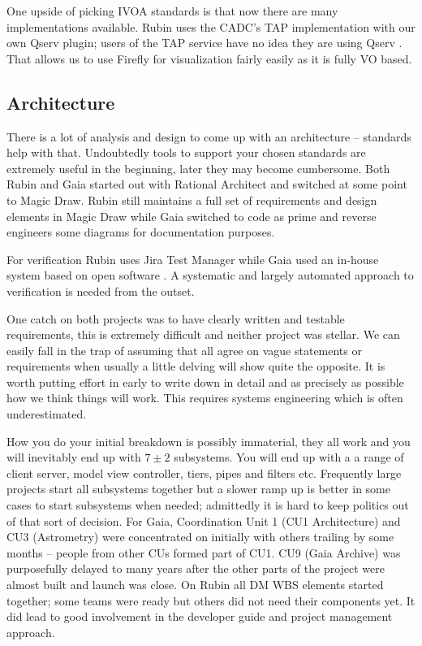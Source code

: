\documentclass[11pt,twoside]{article}
\begin{document}
One upside of picking IVOA standards is that now there are many implementations available.
Rubin uses the CADC's TAP implementation  with our own Qserv  plugin; users of the TAP service have no idea they are using Qserv .
That allows us to use Firefly for visualization fairly easily as it is
fully VO based.

\subsection{Architecture}
There is a lot of analysis and design to come up with an architecture -- standards help with that.
Undoubtedly tools to support your chosen standards are extremely useful in the beginning, later they may become cumbersome. Both Rubin and Gaia started out with Rational Architect and switched at some point to Magic Draw.
Rubin still maintains a full set of requirements and design elements in Magic Draw while Gaia switched to code as prime and reverse engineers some diagrams for documentation purposes.

For verification  Rubin uses  Jira Test Manager \citep{2018SPIE10705E..0US}  while  Gaia  used an in-house system based on open software \citep{2012SPIE.8449E..0GC}.
A systematic and largely automated approach to verification is needed from the outset.

One catch on both projects was to have clearly written and testable requirements, this is extremely difficult and neither project was stellar.
We can easily fall in the trap of assuming that all agree on vague statements or requirements when usually a little delving will show quite the opposite.
It is worth putting effort in early to write down in detail and as precisely as possible how we think things will work.
This requires systems engineering which is often underestimated.


How you do your initial breakdown is possibly immaterial, they all work and you will inevitably end up with $7 \pm 2$ subsystems.
You will end up with a a range of client server, model view controller, tiers, pipes and filters etc.
Frequently large projects start all subsystems together but
a slower ramp up is better in some cases to start subsystems when needed; admittedly it is  hard to keep politics out of that sort of decision.
For Gaia, Coordination Unit 1 (CU1 Architecture) and CU3 (Astrometry) were concentrated on initially with others trailing by some months -- people from other CUs formed part of CU1.
CU9 (Gaia Archive) was purposefully delayed to many years after the other parts of the project were almost built and launch was close.
On Rubin all DM WBS elements started together;
some  teams were ready but others did not need their components  yet.
It did lead to good involvement in the developer guide and project management approach.
\end{document}
